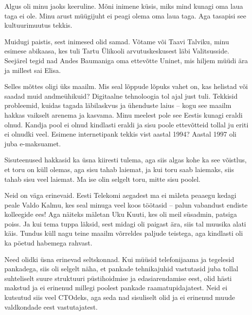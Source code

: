 Algus oli minu jaoks keeruline. Mõni inimene küsis, miks mind kunagi 
oma laua taga ei ole. Minu arust müügijuht ei peagi olema oma laua taga. Aga tasapisi see kultuurimuutus tekkis.


Muidugi paistis, sest inimesed olid samad. Võtame või Taavi 
Talviku, minu esimese abikaasa, kes tuli Tartu 
Ülikooli arvutuskeskusest läbi 
Valitsusside. Seejärel tegid nad Andes 
Baumaniga oma ettevõtte Uninet, mis hiljem müüdi ära ja millest sai 
Elisa. 

Selles mõttes oligi üks maailm. Mis seal lõppude lõpuks vahet on, kas helistad või saadad muid 
andmeühikuid? Digitaalne tehnoloogia tol ajal just tuli. Tekkisid 
probleemid, kuidas tagada läbilaskvus ja ühenduste laius -- kogu see maailm 
hakkas vaikselt arenema ja kasvama. Minu meelest 
pole see Eestis kunagi eraldi olnud. Kandja pool ei olnud kindlasti eraldi ja sisu 
poole ettevõtteid tollal ju eriti ei olnudki veel. Esimene internetipank tekkis vist aastal 1994? Aastal 1997 oli juba e-maksuamet.

Sisuteenused hakkasid ka üsna kiiresti tulema, aga siis algas kohe ka see 
võistlus, et toru on küll olemas, aga sisu tahab laiemat, ja kui toru saab laiemaks, siis tahab sisu 
veel laiemat. Ma ise olin selgelt toru, mitte sisu poolel.


Neid on väga erinevaid. Eesti Telekomi aegadest ma ei mäleta peaaegu kedagi 
peale Valdo Kalmu, kes seal minuga veel koos töötasid -- palun vabandust endiste kolleegide ees! Aga näiteks mäletan Uku 
Kuuti, kes oli meil süsadmin, patsiga poiss. Ja 
kui tema tuppa läksid, sest midagi oli paigast ära, siis tal muusika alati käis. 
Tundus küll nagu teine maailm võrreldes paljude teistega, aga kindlasti 
oli ka pöetud habemega rahvast.

Need olidki üsna erinevad seltskonnad. Kui müüsid telefonijaama ja tegelesid 
pankadega, siis oli selgelt näha, et pankade tehnikajuhid vastutasid juba 
tollal suhteliselt suure struktuuri püstihoidmise ja edasiarendamise 
eest, olid hästi makstud ja ei erinenud millegi poolest pankade
raamatupidajatest. Neid ei kutsutud siis veel CTOdeks, aga seda nad sisuliselt 
olid ja ei erinenud muude valdkondade eest vastutajatest. 

